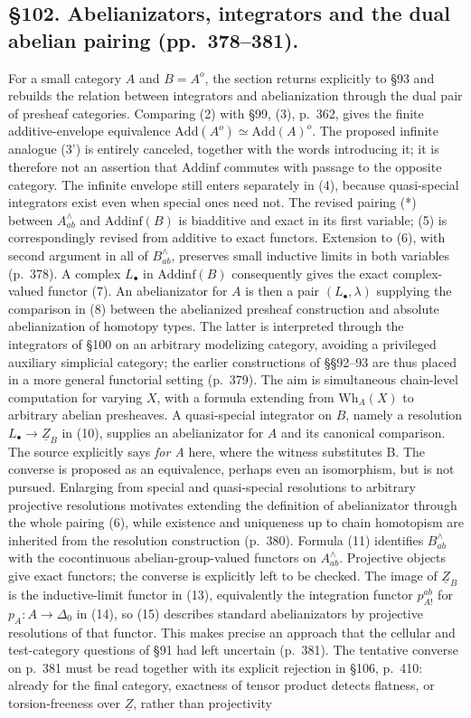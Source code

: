 \documentclass[10pt,oneside]{book}
\begin{document}
\subsection*{\S102. Abelianizators, integrators and the dual abelian pairing (pp.\ 378--381).}
For a small category $A$ and $B=A^o$, the section returns explicitly to \S93 and rebuilds the relation between integrators and abelianization through the dual pair of presheaf categories. Comparing (2) with \S99, (3), p.\ 362, gives the finite additive-envelope equivalence $\mathrm{Add}(A^o)\simeq\mathrm{Add}(A)^o$. The proposed infinite analogue (3') is entirely canceled, together with the words introducing it; it is therefore not an assertion that $\mathrm{Addinf}$ commutes with passage to the opposite category. The infinite envelope still enters separately in (4), because quasi-special integrators exist even when special ones need not. The revised pairing (*) between $A^\wedge_{ab}$ and $\mathrm{Addinf}(B)$ is biadditive and exact in its first variable; (5) is correspondingly revised from additive to exact functors. Extension to (6), with second argument in all of $B^\wedge_{ab}$, preserves small inductive limits in both variables (p.\ 378). A complex $L_\bullet$ in $\mathrm{Addinf}(B)$ consequently gives the exact complex-valued functor (7). An abelianizator for $A$ is then a pair $(L_\bullet,\lambda)$ supplying the comparison in (8) between the abelianized presheaf construction and absolute abelianization of homotopy types. The latter is interpreted through the integrators of \S100 on an arbitrary modelizing category, avoiding a privileged auxiliary simplicial category; the earlier constructions of \S\S92--93 are thus placed in a more general functorial setting (p.\ 379). The aim is simultaneous chain-level computation for varying $X$, with a formula extending from $\mathrm{Wh}_A(X)$ to arbitrary abelian presheaves. A quasi-special integrator on $B$, namely a resolution $L_\bullet\to\underline Z_B$ in (10), supplies an abelianizator for $A$ and its canonical comparison. The source explicitly says \emph{for A} here, where the witness substitutes B. The converse is proposed as an equivalence, perhaps even an isomorphism, but is not pursued. Enlarging from special and quasi-special resolutions to arbitrary projective resolutions motivates extending the definition of abelianizator through the whole pairing (6), while existence and uniqueness up to chain homotopism are inherited from the resolution construction (p.\ 380). Formula (11) identifies $B^\wedge_{ab}$ with the cocontinuous abelian-group-valued functors on $A^\wedge_{ab}$. Projective objects give exact functors; the converse is explicitly left to be checked. The image of $\underline Z_B$ is the inductive-limit functor in (13), equivalently the integration functor $p^{ab}_{A!}$ for $p_A:A\to\Delta_0$ in (14), so (15) describes standard abelianizators by projective resolutions of that functor. This makes precise an approach that the cellular and test-category questions of \S91 had left uncertain (p.\ 381). The tentative converse on p.\ 381 must be read together with its explicit rejection in \S106, p.\ 410: already for the final category, exactness of tensor product detects flatness, or torsion-freeness over $\underline Z$, rather than projectivity 
\end{document}
